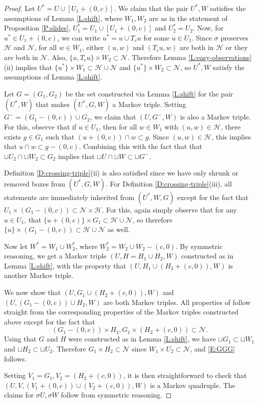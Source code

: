 \documentclass[aop, preprint]{imsart}
\theoremstyle{plain}
\theoremstyle{definition}
\theoremstyle{plain}
\newcommand{\sset}{\subset}
\newcommand{\sig}{\sigma}
\newcommand{\scrH}{\mathcal{H}}
\newcommand{\scrN}{\mathcal{N}}
\newcommand{\X}{\times}
\begin{document}
\begin{proof}
	Let $U^* = U \cup [U_1 + (0, c)]$. We claim that the pair $U^*, W$ satisfies the assumptions of Lemma \ref{L:shift}, where $W_1, W_2$ are as in the statement of Proposition \ref{P:slides}, $U^*_1 = U_1 \cup [U_1 + (0, c)]$ and $U^*_2 = U_2$. Now, for $u^* \in U_1 + (0, c)$, we can write $u^* = u \cup T_c u$ for some $u \in U_1$. Since $\sig$ preserves $\scrH$ and $\scrN$, for all $w \in W_1$, either $(u, w)$ and $(T_c u, w)$ are both in $\scrH$ or they are both in $\scrN$. Also, $\{u, T_c u\} \X W_2 \sset \scrN$. Therefore Lemma \ref{L:easy-observations} (ii) implies that $\{u^*\} \X W_1 \sset \scrH \cup \scrN$ and $\{u^*\} \X W_2 \sset \scrN$, so $U^*, W$ satisfy the assumptions of Lemma \ref{L:shift}.
	
	Let $G = (G_1, G_2)$ be the set constructed via Lemma \ref{L:shift} for the pair $(U^*, W)$ that makes $(U^*, G, W)$ a Markov triple. 
	Setting $G^- = (G_1 - (0, c)) \cup G_2$, we claim that $(U, G^-, W)$ is also a Markov triple. For this, observe that if $u \in U_1$, then for all $w \in W_1$ with $(u, w) \in \scrH$, there exists $g \in G_1$ such that $(u + (0, c)) \cap w \sset g$. Since $(u, w) \in \scrH$, this implies that $u \cap w \sset g - (0, c)$. Combining this with the fact that that $\sqcup U_2 \cap \sqcup W_2 \sset G_2$ implies that $\sqcup U \cap \sqcup W \sset \sqcup G^-$.
	
	Definition \ref{D:crossing-triple}(ii) is also satisfied since we have only shrunk or removed boxes from $(U^*, G, W)$. For Definition \ref{D:crossing-triple}(iii), all statements are immediately inherited from $(U^*, W, G)$ except for the fact that $U_1 \X (G_1 - (0, c)) \sset \scrN \X \scrH$. For this, again simply observe that for any $u \in U_1$, that $\{u + (0, c)\} \X G_1 \sset \scrH \cup \scrN$, so therefore $\{u\} \X (G_1 - (0, c)) \sset \scrH \cup \scrN$ as well.
	
	Now let $W^* = W_1 \cup W_2^*$, where $W_2^* = W_2 \cup W_2 - (c, 0)$. By symmetric reasoning, we get a Markov triple $(U, H = H_1 \cup H_2, W)$ constructed as in Lemma \ref{L:shift}, with the property that $(U, H_1 \cup (H_2 + (c, 0)), W)$ is another Markov triple.
	
	We now show that $(U, G_1 \cup (H_2 + (c, 0)), W)$ and  $(U, (G_1 - (0, c)) \cup H_2, W)$ are both Markov triples. All properties of follow straight from the corresponding properties of the Markov triples constructed above except for the fact that
	\begin{equation}
	\label{E:GGG}
	(G_1 - (0, c))\X H_2, G_1 \X (H_2 + (c, 0)) \sset \scrN.
	\end{equation}
	Using that $G$ and $H$ were constructed as in Lemma \ref{L:shift}, we have $\sqcup G_1 \sset \sqcup W_1$ and $\sqcup H_2 \sset \sqcup U_2$. Therefore $G_1 \X H_2 \sset \scrN$ since $W_1 \X U_2 \sset \scrN$, and \eqref{E:GGG} follows. 
	
	Setting $V_1 = G_1, V_2 = (H_2 + (c, 0))$, it is then straightforward to check that $(U, V, (V_1 + (0, c)) \cup (V_2 + (c, 0)), W)$ is a Markov quadruple. The claims for $\sig U, \sig W$ follow from symmetric reasoning.
\end{proof}
\end{document}
